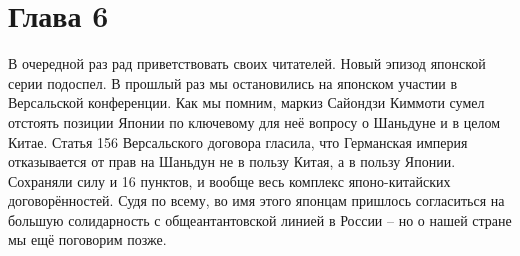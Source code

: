 \chapter{Глава 6}

В очередной раз рад приветствовать своих читателей. Новый эпизод японской серии подоспел. В прошлый раз мы остановились на японском участии в Версальской конференции. Как мы помним, маркиз Сайондзи Киммоти сумел отстоять позиции Японии по ключевому для неё вопросу о Шаньдуне и в целом Китае. Статья 156 Версальского договора гласила, что Германская империя отказывается от прав на Шаньдун не в пользу Китая, а в пользу Японии. Сохраняли силу и 16 пунктов, и вообще весь комплекс японо-китайских договорённостей. Судя по всему, во имя этого японцам пришлось согласиться на большую солидарность с общеантантовской линией в России – но о нашей стране мы ещё поговорим позже.

